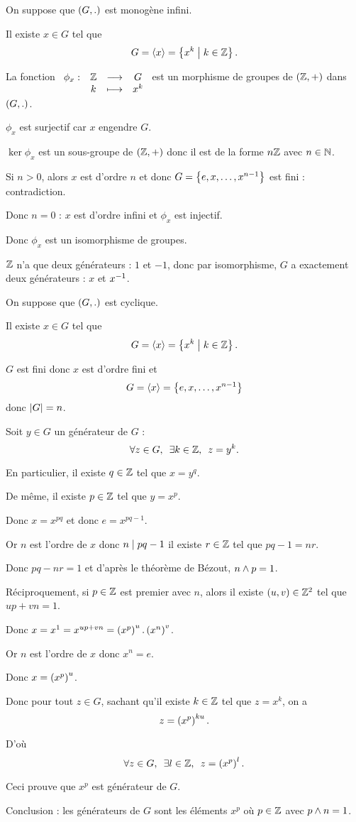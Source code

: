 \begin{dem}
On suppose que \(\groupe{G}[.]\) est monogène infini.

Il existe \(x\in G\) tel que \[G=\langle x\rangle=\left\lbrace x^k\;\middle|\; k\in\mathbb{Z}\right\rbrace.\]

La fonction \(\begin{array}[t]{cccc}\phi_x : & \mathbb{Z} & \longrightarrow & G \\ & k & \longmapsto & x^k\end{array}\) est un morphisme de groupes de \(\groupe{\Z}\) dans \(\groupe{G}[.]\).

\(\phi_x\) est surjectif car \(x\) engendre \(G\).

\(\ker\phi_x\) est un sous-groupe de \(\groupe{\Z}\) donc il est de la forme \(n\mathbb{Z}\) avec \(n\in\mathbb{N}\).

Si \(n>0\), alors \(x\) est d'ordre \(n\) et donc \(G=\left\lbrace e,x,\dots,x^{n-1}\right\rbrace\) est fini : contradiction.

Donc \(n=0\) : \(x\) est d'ordre infini et \(\phi_x\) est injectif.

Donc \(\phi_x\) est un isomorphisme de groupes.

\(\mathbb{Z}\) n'a que deux générateurs : \(1\) et \(-1\), donc par isomorphisme, \(G\) a exactement deux générateurs : \(x\) et \(x^{-1}\).
\end{dem}

\begin{dem}
On suppose que \(\groupe{G}[.]\) est cyclique.

Il existe \(x\in G\) tel que \[G=\langle x\rangle=\left\lbrace x^k\;\middle|\; k\in\mathbb{Z}\right\rbrace.\]

\(G\) est fini donc \(x\) est d'ordre fini et \[G=\langle x\rangle=\left\lbrace e,x,\dots,x^{n-1}\right\rbrace\] donc \(\left\lvert G\right\rvert=n\).

Soit \(y\in G\) un générateur de \(G\) : \[\quantifs{\forall z\in G;\exists k\in\Z}z=y^k.\]

En particulier, il existe \(q\in\mathbb{Z}\) tel que \(x=y^q\).

De même, il existe \(p\in\mathbb{Z}\) tel que \(y=x^p\).

Donc \(x=x^{pq}\) et donc \(e=x^{pq-1}\).

Or \(n\) est l'ordre de \(x\) donc \(n\mid pq-1\) \ie il existe \(r\in\mathbb{Z}\) tel que \(pq-1=nr\).

Donc \(pq-nr=1\) et d'après le théorème de Bézout, \(n\land p=1\).

Réciproquement, si \(p\in\mathbb{Z}\) est premier avec \(n\), alors il existe \(\left(u,v\right)\in\mathbb{Z}^2\) tel que \(up+vn=1\).

Donc \(x=x^1=x^{up+vn}=\left(x^p\right)^u.\left(x^n\right)^v\).

Or \(n\) est l'ordre de \(x\) donc \(x^n=e\).

Donc \(x=\left(x^p\right)^u\).

Donc pour tout \(z\in G\), sachant qu'il existe \(k\in\mathbb{Z}\) tel que \(z=x^k\), on a \[z=\left(x^p\right)^{ku}.\]

D'où \[\quantifs{\forall z\in G;\exists l\in\Z}z=\paren{x^p}^l.\]

Ceci prouve que \(x^p\) est générateur de \(G\).

Conclusion : les générateurs de \(G\) sont les éléments \(x^p\) où \(p\in\mathbb{Z}\) avec \(p\land n=1\).
\end{dem}

